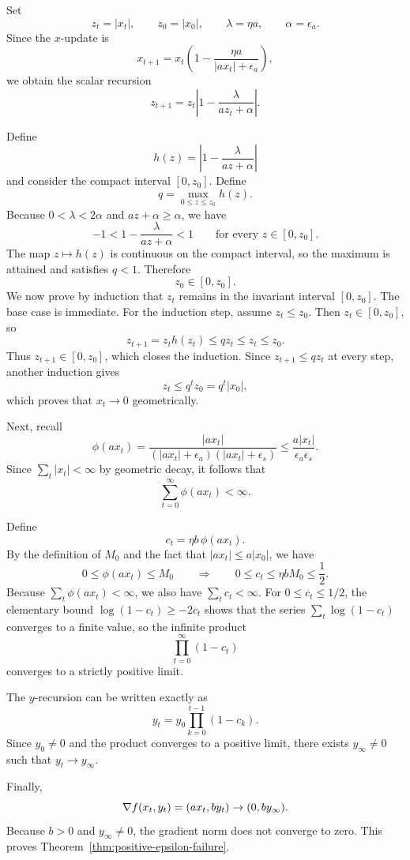 Set
\[
z_t=|x_t|,\qquad z_0=|x_0|,\qquad \lambda=\eta a,\qquad \alpha=\epsilon_a.
\]
Since the $x$-update is
\[
x_{t+1}=x_t\left(1-\frac{\eta a}{|a x_t|+\epsilon_a}\right),
\]
we obtain the scalar recursion
\[
z_{t+1}
=
z_t\left|1-\frac{\lambda}{a z_t+\alpha}\right|.
\]

Define
\[
h(z)=\left|1-\frac{\lambda}{a z+\alpha}\right|
\]
and consider the compact interval $[0,z_0]$. Define
\[
q=
\max_{0\le z\le z_0} h(z).
\]
Because $0<\lambda<2\alpha$ and $a z+\alpha\ge \alpha$, we have
\[
-1
<
1-\frac{\lambda}{a z+\alpha}
< 
1
\qquad\text{for every }z\in[0,z_0].
\]
The map $z\mapsto h(z)$ is continuous on the
compact interval, so the maximum is attained and satisfies $q<1$. Therefore
\[
z_0\in[0,z_0].
\]
We now prove by induction that $z_t$ remains in the invariant interval
$[0,z_0]$. The base case is immediate. For the induction step, assume
$z_t\le z_0$. Then $z_t\in[0,z_0]$, so
\[
z_{t+1}=z_t h(z_t)\le q z_t\le z_t\le z_0.
\]
Thus $z_{t+1}\in[0,z_0]$, which closes the induction. Since
$z_{t+1}\le q z_t$ at every step, another induction gives
\[
z_t\le q^t z_0=q^t|x_0|,
\]
which proves that $x_t\to 0$ geometrically.

Next, recall
\[
\phi(a x_t)
=
\frac{|a x_t|}{(|a x_t|+\epsilon_a)(|a x_t|+\epsilon_s)}
\le
\frac{a|x_t|}{\epsilon_a\epsilon_s}.
\]
Since $\sum_t |x_t|<\infty$ by geometric decay, it follows that
\[
\sum_{t=0}^\infty \phi(a x_t)<\infty.
\]

Define
\[
c_t=\eta b\,\phi(a x_t).
\]
By the definition of $M_0$ and the fact that $|a x_t|\le a|x_0|$, we have
\[
0\le \phi(a x_t)\le M_0
\qquad\Longrightarrow\qquad
0\le c_t\le \eta b M_0\le \frac12.
\]
Because $\sum_t \phi(a x_t)<\infty$, we also have $\sum_t c_t<\infty$. For
$0\le c_t\le 1/2$, the elementary bound $\log(1-c_t)\ge -2c_t$ shows that the
series $\sum_t \log(1-c_t)$ converges to a finite value, so the infinite
product
\[
\prod_{t=0}^\infty (1-c_t)
\]
converges to a strictly positive limit.

The $y$-recursion can be written exactly as
\[
y_t
=
y_0\prod_{k=0}^{t-1}(1-c_k).
\]
Since $y_0\neq 0$ and the product converges to a positive limit, there exists
$y_\infty\neq 0$ such that $y_t\to y_\infty$.

Finally,
\[
\nabla f(x_t,y_t)=(a x_t,b y_t)\to (0,b y_\infty).
\]
Because $b>0$ and $y_\infty\neq 0$, the gradient norm does not converge to
zero. This proves Theorem~\ref{thm:positive-epsilon-failure}.
